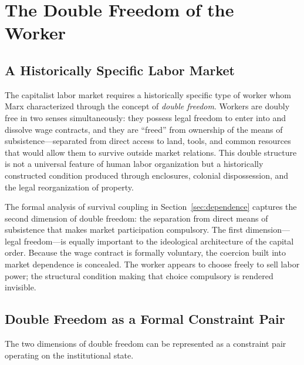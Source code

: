 \documentclass[12pt,a4paper]{article}
\theoremstyle{definition}
\theoremstyle{remark}
\begin{document}
\section{The Double Freedom of the Worker}
\label{sec:double_freedom}

\subsection{A Historically Specific Labor Market}

The capitalist labor market requires a historically specific type of worker whom Marx characterized through the concept of \emph{double freedom}. Workers are doubly free in two senses simultaneously: they possess legal freedom to enter into and dissolve wage contracts, and they are ``freed'' from ownership of the means of subsistence---separated from direct access to land, tools, and common resources that would allow them to survive outside market relations. This double structure is not a universal feature of human labor organization but a historically constructed condition produced through enclosures, colonial dispossession, and the legal reorganization of property.

The formal analysis of survival coupling in Section~\ref{sec:dependence} captures the second dimension of double freedom: the separation from direct means of subsistence that makes market participation compulsory. The first dimension---legal freedom---is equally important to the ideological architecture of the capital order. Because the wage contract is formally voluntary, the coercion built into market dependence is concealed. The worker appears to choose freely to sell labor power; the structural condition making that choice compulsory is rendered invisible.

\subsection{Double Freedom as a Formal Constraint Pair}

The two dimensions of double freedom can be represented as a constraint pair operating on the institutional state.
\end{document}
